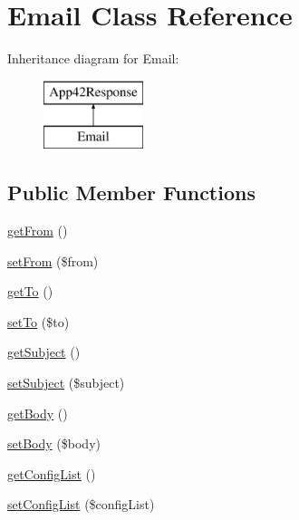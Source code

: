 \hypertarget{class_email}{\section{Email Class Reference}
\label{class_email}
}
Inheritance diagram for Email\+:\begin{figure}[H]
\begin{center}
\leavevmode
\includegraphics[height=2.000000cm]{class_email}
\end{center}
\end{figure}
\subsection*{Public Member Functions}
\begin{DoxyCompactItemize}
\item 
\hyperlink{class_email_a28bd887dc9236a9c87f1d5cbe9c5875d}{get\+From} ()
\item 
\hyperlink{class_email_a7ab6c9cf4badddf84471681871523402}{set\+From} (\$from)
\item 
\hyperlink{class_email_addfa0ac916b451938b5ad7aceeb03820}{get\+To} ()
\item 
\hyperlink{class_email_a9791b70ae61162cf897786dc0948475b}{set\+To} (\$to)
\item 
\hyperlink{class_email_a7ec8f5b794ded8f3c0df9afd96c8233c}{get\+Subject} ()
\item 
\hyperlink{class_email_a971f2abb85a2e0fc85954322896d6b80}{set\+Subject} (\$subject)
\item 
\hyperlink{class_email_ad7bab1db052fb9fcc8bd0b4f3eac29ac}{get\+Body} ()
\item 
\hyperlink{class_email_a043c9fa5f271098eb80d5949ba1d6a11}{set\+Body} (\$body)
\item 
\hyperlink{class_email_a90ac44f78466b0c9677e9f837b3ab9ad}{get\+Config\+List} ()
\item 
\hyperlink{class_email_a6296a050d2aec4e8dbee81810f5bc6e8}{set\+Config\+List} (\$config\+List)
\end{DoxyCompactItemize}
